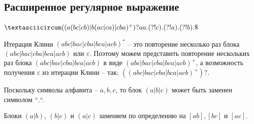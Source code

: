 \documentclass[a4paper, 14pt]{extarticle}
\begin{document}
\subsection{Расширенное регулярное выражение}

$\textasciicircum ((a(bc|cb)|b(ac|ca)|cba)^+)?aa.(?! c).(?! a).(?! b).\$$

Итерация Клини $(abc|bac|cba|bca|acb)^*$ -- это повторение несколько раз  блока $(abc|bac|cba|bca|acb)$ или $\varepsilon$. Поэтому можем представить повторение нескольких раз блока $(abc|bac|cba|bca|acb)$ в виде $(abc|bac|cba|bca|acb)^+$, а возможность получения $\varepsilon$ из итерации Клини -- так: $((abc|bac|cba|bca|acb)^+)?$.

Поскольку символы алфавита -- $a, b, c$, то блок $(a|b|c)$ может быть заменен символом ``$.$``.


Блоки $(a|b)$, $(b|c)$ и $(a|c)$ заменяем по определению на $\left[ab\right],\left[bc\right]$ и $\left[ac\right]$.
\end{document}
